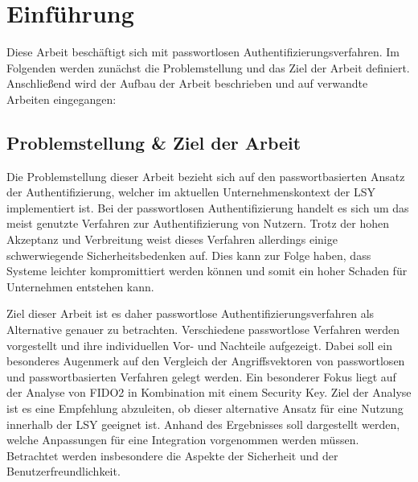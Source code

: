 
\chapter{Einführung}
Diese Arbeit beschäftigt sich mit passwortlosen Authentifizierungsverfahren. Im Folgenden werden zunächst die Problemstellung und das Ziel der Arbeit definiert. Anschließend wird der Aufbau der Arbeit beschrieben und auf verwandte Arbeiten eingegangen:

\section{Problemstellung \& Ziel der Arbeit} \label{target}
Die Problemstellung dieser Arbeit bezieht sich auf den passwortbasierten Ansatz der Authentifizierung, welcher im aktuellen Unternehmenskontext der \ac{LSY} implementiert ist. Bei der passwortlosen Authentifizierung handelt es sich um das meist genutzte Verfahren zur Authentifizierung von Nutzern. Trotz der hohen Akzeptanz und Verbreitung weist dieses Verfahren allerdings einige schwerwiegende Sicherheitsbedenken auf. Dies kann zur Folge haben, dass Systeme leichter kompromittiert werden können und somit ein hoher Schaden für Unternehmen entstehen kann.

Ziel dieser Arbeit ist es daher passwortlose Authentifizierungsverfahren als Alternative genauer zu betrachten. Verschiedene passwortlose Verfahren werden vorgestellt und ihre individuellen Vor- und Nachteile aufgezeigt. Dabei soll ein besonderes Augenmerk auf den Vergleich der Angriffsvektoren von passwortlosen und passwortbasierten Verfahren gelegt werden. Ein besonderer Fokus liegt auf der Analyse von \ac{FIDO}2 in Kombination mit einem Security Key. Ziel der Analyse ist es eine Empfehlung abzuleiten, ob dieser alternative Ansatz für eine Nutzung innerhalb der \ac{LSY} geeignet ist. Anhand des Ergebnisses soll dargestellt werden, welche Anpassungen für eine Integration vorgenommen werden müssen. Betrachtet werden insbesondere die Aspekte der Sicherheit und der Benutzerfreundlichkeit.

